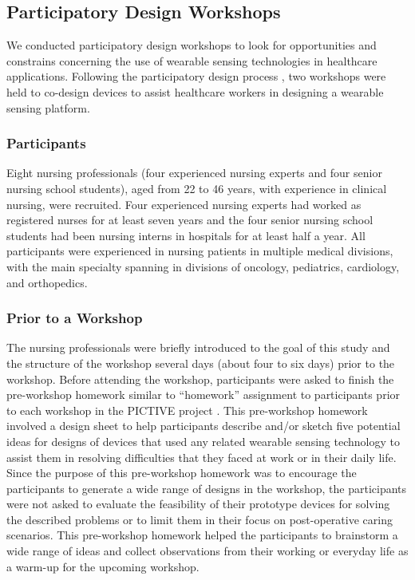 \subsection{Participatory Design Workshops}
We conducted participatory design workshops to look for opportunities and constrains concerning the use of wearable sensing technologies in healthcare applications. Following the participatory design process \cite{Greenbaum:1992:DWC:125470, Muller:2002:PDT:772072.772138}, two workshops were held to co-design devices to assist healthcare workers in designing a wearable sensing platform.

\subsubsection{Participants}
Eight nursing professionals (four experienced nursing experts and four senior nursing school students), aged from 22 to 46 years, with experience in clinical nursing, were recruited. Four experienced nursing experts had worked as registered nurses for at least seven years and the four senior nursing school students had been nursing interns in hospitals for at least half a year. All participants were experienced in nursing patients in multiple medical divisions, with the main specialty spanning in divisions of oncology, pediatrics, cardiology, and orthopedics.

\subsubsection{Prior to a Workshop}
The nursing professionals were briefly introduced to the goal of this study and the structure of the workshop several days (about four to six days) prior to the workshop. Before attending the workshop, participants were asked to finish the pre-workshop homework similar to “homework” assignment to participants prior to each workshop in the PICTIVE project \cite{Muller:1991:PEP:108844.108896}. This pre-workshop homework involved a design sheet to help participants describe and/or sketch five potential ideas for designs of devices that used any related wearable sensing technology to assist them in resolving difficulties that they faced at work or in their daily life. Since the purpose of this pre-workshop homework was to encourage the participants to generate a wide range of designs in the workshop, the participants were not asked to evaluate the feasibility of their prototype devices for solving the described problems or to limit them in their focus on post-operative caring scenarios. This pre-workshop homework helped the participants to brainstorm a wide range of ideas and collect observations from their working or everyday life as a warm-up for the upcoming workshop.

